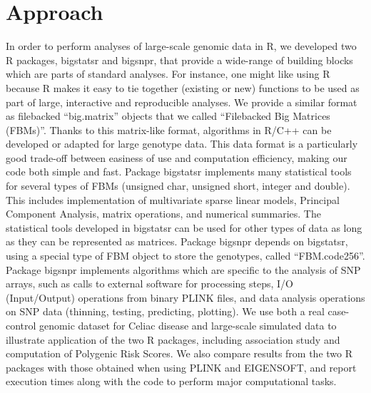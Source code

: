 \documentclass{bioinfo}
\begin{document}

\section{Approach}

{\color{red}
In order to perform analyses of large-scale genomic data in R, we developed two R packages, bigstatsr and bigsnpr, that provide a wide-range of building blocks which are parts of standard analyses. 
For instance, one might like using R because R makes it easy to tie together (existing or new) functions to be used as part of large, interactive and reproducible analyses.
We provide a similar format as filebacked ``big.matrix'' objects that we called ``Filebacked Big Matrices (FBMs)''. Thanks to this matrix-like format, algorithms in R/C++ can be developed or adapted for large genotype data. This data format is a particularly good trade-off between easiness of use and computation efficiency, making our code both simple and fast.
}
Package bigstatsr implements many statistical tools for several types of FBMs (unsigned char, unsigned short, integer and double). This includes implementation of multivariate sparse linear models, Principal Component Analysis, matrix operations, and numerical summaries. The statistical tools developed in bigstatsr can be used for other types of data as long as they can be represented as matrices. Package bigsnpr depends on bigstatsr, using a special type of FBM object to store the genotypes, called ``FBM.code256''. Package bigsnpr implements algorithms which are specific to the analysis of SNP arrays, such as calls to external software for processing steps, I/O (Input/Output) operations from binary PLINK files, and data analysis operations on SNP data (thinning, testing, predicting, plotting). 
We use both a real case-control genomic dataset for Celiac disease and large-scale simulated data to illustrate application of the two R packages, including association study and computation of Polygenic Risk Scores. We also compare results from the two R packages with those obtained when using PLINK and EIGENSOFT, and report execution times along with the code to perform major computational tasks.
\end{document}
